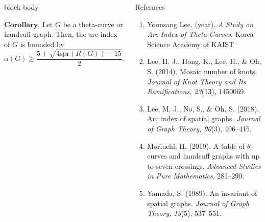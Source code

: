 \documentclass[final]{beamer}
\begin{document}
\begin{frame}[t]
\begin{columns}[t]
\begin{beamercolorbox}[rounded=true, shadow=false, wd=\textwidth]{block body}
    \vspace{1em}

    $\mathbf{Corollary.}$  Let $G$ be a theta-curve or handcuff graph. Then, the arc index of $G$ is bounded by
      \[ \alpha(G) \geq \frac{5 + \sqrt{4 \mathrm{spr}(R(G)) - 15}}{2}. \]
  \end{beamercolorbox}

  \begin{block}{Refernces}
    \begin{enumerate}
      \item Yoonsang Lee. (year). \textit{A Study on Arc Index of Theta-Curves}. Korea Science Academy of KAIST
      \item Lee, H. J., Hong, K., Lee, H., & Oh, S. (2014). Mosaic number of knots. \textit{Journal of Knot Theory and Its Ramifications, 23}(13), 1450069.
      \item Lee, M. J., No, S., & Oh, S. (2018). Arc index of spatial graphs. \textit{Journal of Graph Theory, 90}(3), 406–415.
      \item Moriuchi, H. (2019). A table of $\theta$-curves and handcuff graphs with up to seven crossings. \textit{Advanced Studies in Pure Mathematics}, 281–290.
      \item Yamada, S. (1989). An invariant of spatial graphs. \textit{Journal of Graph Theory, 13}(5), 537–551.
      
    \end{enumerate}
  \end{block}
\end{columns}



\end{frame}
\end{document}
